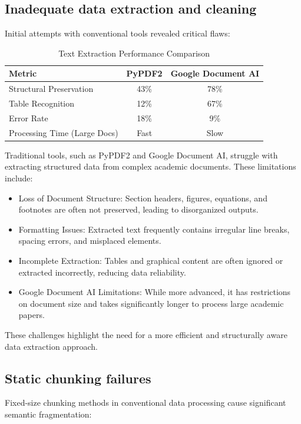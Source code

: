 \documentclass[conference]{IEEEtran}
\begin{document}
\subsection{Inadequate data extraction and cleaning}  
Initial attempts with conventional tools revealed critical flaws:  

\begin{table}[h]  
\caption{Text Extraction Performance Comparison}  
\begin{tabularx}{\linewidth}{lcc}  
\toprule  
\textbf{Metric} & \textbf{PyPDF2} & \textbf{Google Document AI} \\  
\midrule  
Structural Preservation & 43\% & 78\% \\  
Table Recognition & 12\% & 67\% \\  
Error Rate & 18\% & 9\% \\  
Processing Time (Large Docs) & Fast & Slow \\  
\bottomrule  
\end{tabularx}  
\end{table}  

Traditional tools, such as PyPDF2 and Google Document AI, struggle with extracting structured data from complex academic documents. These limitations include:  

\begin{itemize}  
    \item Loss of Document Structure: Section headers, figures, equations, and footnotes are often not preserved, leading to disorganized outputs.  
    \item Formatting Issues: Extracted text frequently contains irregular line breaks, spacing errors, and misplaced elements.  
    \item Incomplete Extraction: Tables and graphical content are often ignored or extracted incorrectly, reducing data reliability.  
    \item Google Document AI Limitations: While more advanced, it has restrictions on document size and takes significantly longer to process large academic papers.  
\end{itemize}  

These challenges highlight the need for a more efficient and structurally aware data extraction approach.  

\subsection{Static chunking failures}  
Fixed-size chunking methods in conventional data processing cause significant semantic fragmentation:  
\end{document}
